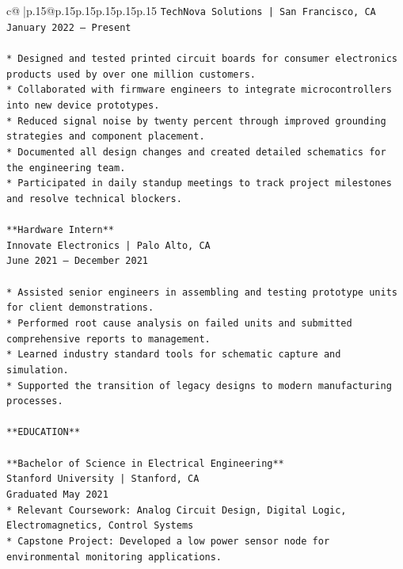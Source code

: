 \documentclass{article}
\begin{document}
{\begin{supertabular}{c@{$\;$}|p{.15\linewidth}@{}p{.15\linewidth}p{.15\linewidth}p{.15\linewidth}p{.15\linewidth}p{.15\linewidth}}
{{{\texttt{TechNova Solutions | San Francisco, CA} \\
\texttt{January 2022 – Present} \\
\\ 
\texttt{*   Designed and tested printed circuit boards for consumer electronics products used by over one million customers.} \\
\texttt{*   Collaborated with firmware engineers to integrate microcontrollers into new device prototypes.} \\
\texttt{*   Reduced signal noise by twenty percent through improved grounding strategies and component placement.} \\
\texttt{*   Documented all design changes and created detailed schematics for the engineering team.} \\
\texttt{*   Participated in daily standup meetings to track project milestones and resolve technical blockers.} \\
\\ 
\texttt{**Hardware Intern**} \\
\texttt{Innovate Electronics | Palo Alto, CA} \\
\texttt{June 2021 – December 2021} \\
\\ 
\texttt{*   Assisted senior engineers in assembling and testing prototype units for client demonstrations.} \\
\texttt{*   Performed root cause analysis on failed units and submitted comprehensive reports to management.} \\
\texttt{*   Learned industry standard tools for schematic capture and simulation.} \\
\texttt{*   Supported the transition of legacy designs to modern manufacturing processes.} \\
\\ 
\texttt{**EDUCATION**} \\
\\ 
\texttt{**Bachelor of Science in Electrical Engineering**} \\
\texttt{Stanford University | Stanford, CA} \\
\texttt{Graduated May 2021} \\
\texttt{*   Relevant Coursework: Analog Circuit Design, Digital Logic, Electromagnetics, Control Systems} \\
\texttt{*   Capstone Project: Developed a low power sensor node for environmental monitoring applications.} \\
\\ 
}}}
\end{supertabular}}
\end{document}
